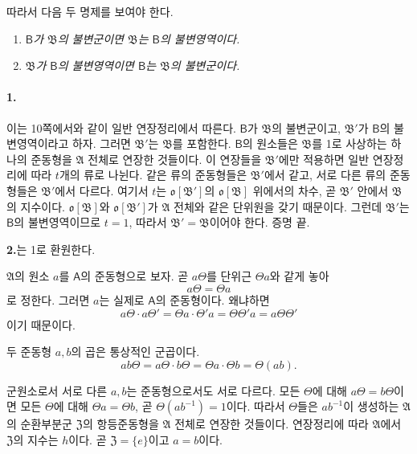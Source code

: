 따라서 다음 두 명제를 보여야 한다.

\begin{enumerate}
\item \emph{\(\mathsf B\)가 \(\mathfrak B\)의 불변군이면 \(\mathfrak B\)는 \(\mathsf B\)의 불변영역이다.}
\item \emph{\(\mathfrak B\)가 \(\mathsf B\)의 불변영역이면 \(\mathsf B\)는 \(\mathfrak B\)의 불변군이다.}
\end{enumerate}

\paragraph{1.}
이는 10쪽에서와 같이 일반 연장정리에서 따른다. \(\mathsf B\)가 \(\mathfrak B\)의 불변군이고, \(\mathfrak B'\)가 \(\mathsf B\)의 불변영역이라고 하자. 그러면 \(\mathfrak B'\)는 \(\mathfrak B\)를 포함한다. \(\mathsf B\)의 원소들은 \(\mathfrak B\)를 1로 사상하는 하나의 준동형을 \(\mathfrak A\) 전체로 연장한 것들이다. 이 연장들을 \(\mathfrak B'\)에만 적용하면 일반 연장정리에 따라 \(t\)개의 류로 나뉜다. 같은 류의 준동형들은 \(\mathfrak B'\)에서 같고, 서로 다른 류의 준동형들은 \(\mathfrak B'\)에서 다르다. 여기서 \(t\)는 \(\mathfrak o[\mathfrak B']\)의 \(\mathfrak o[\mathfrak B]\) 위에서의 차수, 곧 \(\mathfrak B'\) 안에서 \(\mathfrak B\)의 지수이다. \(\mathfrak o[\mathfrak B]\)와 \(\mathfrak o[\mathfrak B']\)가 \(\mathfrak A\) 전체와 같은 단위원을 갖기 때문이다. 그런데 \(\mathfrak B'\)는 \(\mathsf B\)의 불변영역이므로 \(t=1\), 따라서 \(\mathfrak B'=\mathfrak B\)이어야 한다. 증명 끝.

\textbf{2.}는 1로 환원한다.

\(\mathfrak A\)의 원소 \(a\)를 \(\mathsf A\)의 준동형으로 보자. 곧 \(a\Theta\)를 단위근 \(\Theta a\)와 같게 놓아
\[
        a\Theta=\Theta a
\]
로 정한다. 그러면 \(a\)는 실제로 \(\mathsf A\)의 준동형이다. 왜냐하면
\[
        a\Theta\cdot a\Theta'
        =\Theta a\cdot\Theta'a
        =\Theta\Theta'a
        =a\Theta\Theta'
\]
이기 때문이다.

두 준동형 \(a,b\)의 곱은 통상적인 군곱이다.
\[
        ab\Theta
        =a\Theta\cdot b\Theta
        =\Theta a\cdot\Theta b
        =\Theta(ab).
\]

군원소로서 서로 다른 \(a,b\)는 준동형으로서도 서로 다르다. 모든 \(\Theta\)에 대해 \(a\Theta=b\Theta\)이면 모든 \(\Theta\)에 대해 \(\Theta a=\Theta b\), 곧 \(\Theta(ab^{-1})=1\)이다. 따라서 \(\Theta\)들은 \(ab^{-1}\)이 생성하는 \(\mathfrak A\)의 순환부분군 \(\mathfrak Z\)의 항등준동형을 \(\mathfrak A\) 전체로 연장한 것들이다. 연장정리에 따라 \(\mathfrak A\)에서 \(\mathfrak Z\)의 지수는 \(h\)이다. 곧 \(\mathfrak Z=\{e\}\)이고 \(a=b\)이다.

